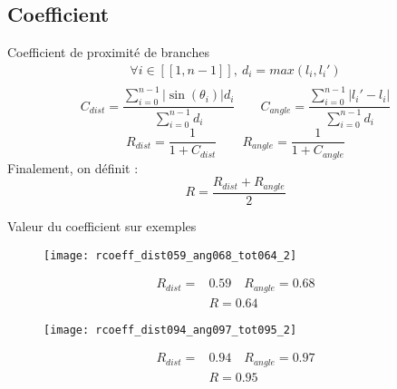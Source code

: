 \subsection{Coefficient}

\begin{frame}{Coefficient de proximité de branches}
    \begin{align*}
    \forall i \in [\![1,n-1]\!],\ d_i = max(l_i,l_i') \\
    \end{align*}
    \begin{equation*}
        C_{dist} = \frac{\displaystyle\sum_{i=0}^{n-1} | \sin(\theta_{i}) | d_i}{\displaystyle\sum_{i=0}^{n-1} d_i} \qquad  
        C_{angle} = \frac{\displaystyle\sum_{i=0}^{n-1} |l_i' - l_i|}{\displaystyle\sum_{i=0}^{n-1} d_i}
    \end{equation*}
    \begin{equation*}
        R_{dist} = \frac{1}{1 + C_{dist}} \qquad R_{angle} = \frac{1}{1 + C_{angle}}
    \end{equation*}
    \newline Finalement, on définit : \newline
    \begin{equation*}
        \boxed{R = \frac{R_{dist}+R_{angle}}{2}}
    \end{equation*}
\end{frame}

\begin{frame}{Valeur du coefficient sur exemples}
    \begin{multicols}{2}
        \begin{figure}
            \centering
            \texttt{[image: rcoeff\_dist059\_ang068\_tot064\_2]}
        \end{figure}
    \vspace*{0.2cm}
        \begin{align*}
            R_{dist} = &0.59 \quad R_{angle} = 0.68 \\
            &\boxed{R = 0.64}
        \end{align*}
    \end{multicols}
    \begin{multicols}{2}
        \begin{figure}
            \centering
            \texttt{[image: rcoeff\_dist094\_ang097\_tot095\_2]}
        \end{figure}
    \vspace*{0.2cm}
            \begin{align*}
                R_{dist} = &0.94 \quad R_{angle} = 0.97 \\
                &\boxed{R = 0.95}
            \end{align*}
    \end{multicols}
\end{frame}